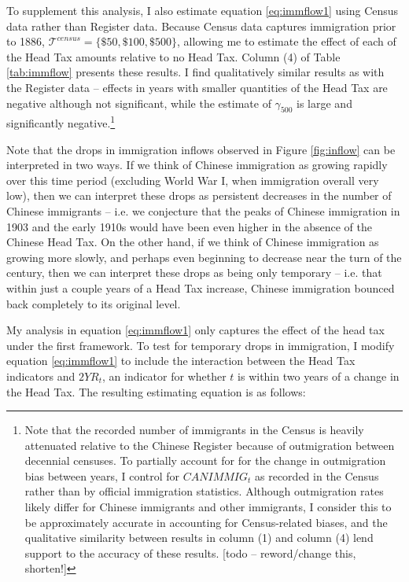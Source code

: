 To supplement this analysis, I also estimate equation \ref{eq:immflow1} using Census data rather than Register data. Because Census data captures immigration prior to 1886, $\mathcal{T}^{census} = \{\$50,\$100,\$500\}$, allowing me to estimate the effect of each of the Head Tax amounts relative to no Head Tax. Column (4) of Table \ref{tab:immflow} presents these results. 
I find qualitatively similar results as with the Register data -- effects in years with smaller quantities of the Head Tax are negative although not significant, while the estimate of $\gamma_{500}$ is large and significantly negative.\footnote{Note that the recorded number of immigrants in the Census is heavily attenuated relative to the Chinese Register because of outmigration between decennial censuses. 
To partially account for for the change in outmigration bias between years, I control for $CANIMMIG_t$ as recorded in the Census rather than by official immigration statistics. Although outmigration rates likely differ for Chinese immigrants and other immigrants, I consider this to be approximately accurate in accounting for Census-related biases, and the qualitative similarity between results in column (1) and column (4) lend support to the accuracy of these results. [todo -- reword/change this, shorten!]}

Note that the drops in immigration inflows observed in Figure \ref{fig:inflow} can be interpreted in two ways. If we think of Chinese immigration as growing rapidly over this time period (excluding World War I, when immigration overall very low), then we can interpret these drops as persistent decreases in the number of Chinese immigrants -- i.e. we conjecture that the peaks of Chinese immigration in 1903 and the early 1910s would have been even higher in the absence of the Chinese Head Tax. On the other hand, if we think of Chinese immigration as growing more slowly, and perhaps even beginning to decrease near the turn of the century, then we can interpret these drops as being only temporary -- i.e. that within just a couple years of a Head Tax increase, Chinese immigration bounced back completely to its original level.

My analysis in equation \ref{eq:immflow1} only captures the effect of the head tax under the first framework. To test for temporary drops in immigration, I modify equation \ref{eq:immflow1} to include the interaction between the Head Tax indicators and $2YR_t$, an indicator for whether $t$ is within two years of a change in the Head Tax. The resulting estimating equation is as follows: 

